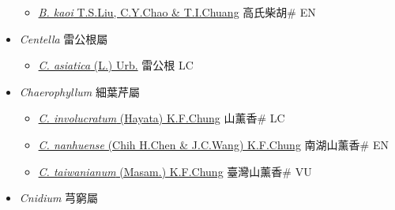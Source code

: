 \begin{itemize}
  \begin{itemize}
        \item[] \href{http://www.theplantlist.org/tpl1.1/search?q=Bupleurum+kaoi}{\textit{B. kaoi} T.S.Liu, C.Y.Chao \& T.I.Chuang}   高氏柴胡\# EN
  \end{itemize}
 \item[] \textit{Centella} 雷公根屬
                    
  \begin{itemize}
        \item[] \href{http://www.theplantlist.org/tpl1.1/search?q=Centella+asiatica}{\textit{C. asiatica} (L.) Urb.}   雷公根 LC
  \end{itemize}
 \item[] \textit{Chaerophyllum} 細葉芹屬
                    
  \begin{itemize}
        \item[] \href{http://www.theplantlist.org/tpl1.1/search?q=Chaerophyllum+involucratum}{\textit{C. involucratum} (Hayata) K.F.Chung}     山薰香\# LC
        \item[] \href{http://www.theplantlist.org/tpl1.1/search?q=Chaerophyllum+nanhuense}{\textit{C. nanhuense} (Chih H.Chen \& J.C.Wang) K.F.Chung}     南湖山薰香\# EN
        \item[] \href{http://www.theplantlist.org/tpl1.1/search?q=Chaerophyllum+taiwanianum}{\textit{C. taiwanianum} (Masam.) K.F.Chung}     臺灣山薰香\# VU
  \end{itemize}
 \item[] \textit{Cnidium} 芎窮屬
                    

\end{itemize}
